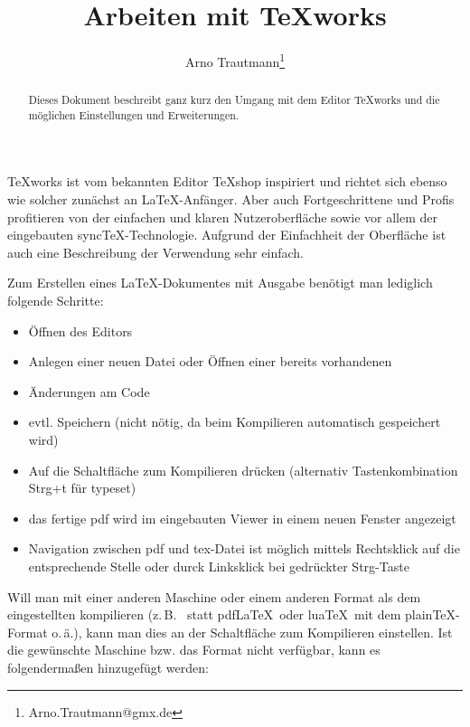 \documentclass{scrartcl}
\title{Arbeiten mit \TeX works}
\author{Arno Trautmann\thanks{Arno.Trautmann@gmx.de}}
\begin{document}
\maketitle
\begin{abstract}
Dieses Dokument beschreibt ganz kurz den Umgang mit dem Editor \TeX works und die möglichen Einstellungen und Erweiterungen.
\end{abstract}
\TeX works ist vom bekannten Editor \TeX shop inspiriert und richtet sich ebenso wie solcher zunächst an \LaTeX-Anfänger. Aber auch Fortgeschrittene und Profis profitieren von der einfachen und klaren Nutzeroberfläche sowie vor allem der eingebauten sync\TeX-Technologie. Aufgrund der Einfachheit der Oberfläche ist auch eine Beschreibung der Verwendung sehr einfach.

Zum Erstellen eines \LaTeX-Dokumentes mit Ausgabe benötigt man lediglich folgende Schritte:

\begin{itemize}
\item Öffnen des Editors
\item Anlegen einer neuen Datei oder Öffnen einer bereits vorhandenen
\item Änderungen am Code
\item evtl. Speichern (nicht nötig, da beim Kompilieren automatisch gespeichert wird)
\item Auf die Schaltfläche zum Kompilieren drücken (alternativ Tastenkombination Strg+t für typeset)
\item das fertige pdf wird im eingebauten Viewer in einem neuen Fenster angezeigt
\item Navigation zwischen pdf und tex-Datei ist möglich mittels Rechtsklick auf die entsprechende Stelle oder durck Linksklick bei gedrückter Strg-Taste
\end{itemize}


Will man mit einer anderen Maschine oder einem anderen Format als dem eingestellten kompilieren (z.\,B. \XeLaTeX\ statt pdf\LaTeX\ oder lua\TeX\ mit dem plain\TeX-Format o.\,ä.), kann man dies an der Schaltfläche zum Kompilieren einstellen. Ist die gewünschte Maschine bzw. das Format nicht verfügbar, kann es folgendermaßen hinzugefügt werden:
\end{document}
